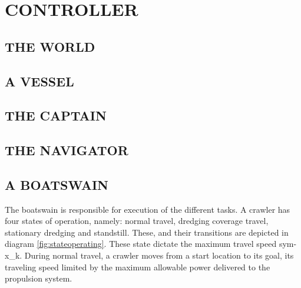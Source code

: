 \section{CONTROLLER}\label{sec:controller}

\subsection{THE WORLD}

\subsection{A VESSEL}

\subsection{THE CAPTAIN}

\subsection{THE NAVIGATOR}


\subsection{A BOATSWAIN}
The boatswain is responsible for execution of the different tasks. A crawler has four states of operation, namely:
normal travel, dredging coverage travel, stationary dredging and standstill. These, and their transitions are depicted
in diagram \ref{fig:stateoperating}. These state dictate the maximum travel speed \gls{sym-x_k}. During normal travel, a
crawler moves from a start location to its goal, its traveling speed limited by the  maximum allowable power
delivered to the propulsion system.

